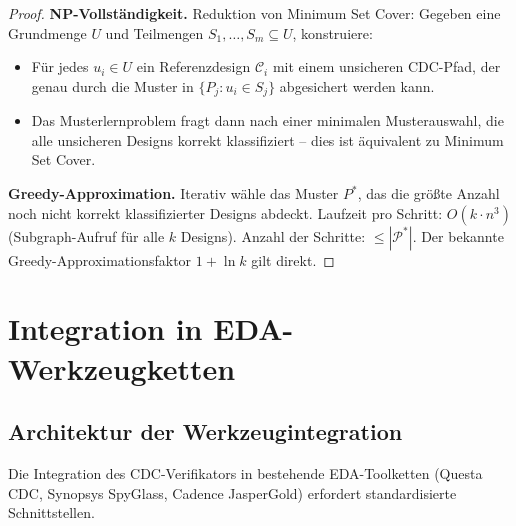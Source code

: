 ﻿\documentclass[a4paper,12pt]{article}
\theoremstyle{definition}
\begin{document}
	\begin{proof}
		\textbf{NP-Vollst\"andigkeit.}
		Reduktion von Minimum Set Cover: Gegeben eine Grundmenge $U$ und
		Teilmengen $S_1, \ldots, S_m \subseteq U$, konstruiere:
		\begin{itemize}
			\item F\"ur jedes $u_i \in U$ ein Referenzdesign $\mathcal{C}_i$ mit einem
			unsicheren CDC-Pfad, der genau durch die Muster in
			$\{P_j : u_i \in S_j\}$ abgesichert werden kann.
			\item Das Musterlernproblem fragt dann nach einer minimalen Musterauswahl,
			die alle unsicheren Designs korrekt klassifiziert -- dies ist \"aquivalent
			zu Minimum Set Cover.
		\end{itemize}
		
		\textbf{Greedy-Approximation.}
		Iterativ w\"ahle das Muster $P^*$, das die gr\"o\ss{}te Anzahl noch nicht
		korrekt klassifizierter Designs abdeckt. Laufzeit pro Schritt: $O(k \cdot n^3)$
		(Subgraph-Aufruf f\"ur alle $k$ Designs). Anzahl der Schritte: $\leq |\mathcal{P}^*|$.
		Der bekannte Greedy-Approximationsfaktor $1 + \ln k$ gilt direkt. \qedhere
	\end{proof}
	
	\section{Integration in EDA-Werkzeugketten}
	
	\subsection{Architektur der Werkzeugintegration}
	
	Die Integration des CDC-Verifikators in bestehende EDA-Toolketten
	(Questa CDC, Synopsys SpyGlass, Cadence JasperGold) erfordert
	standardisierte Schnittstellen.
	
\end{document}
